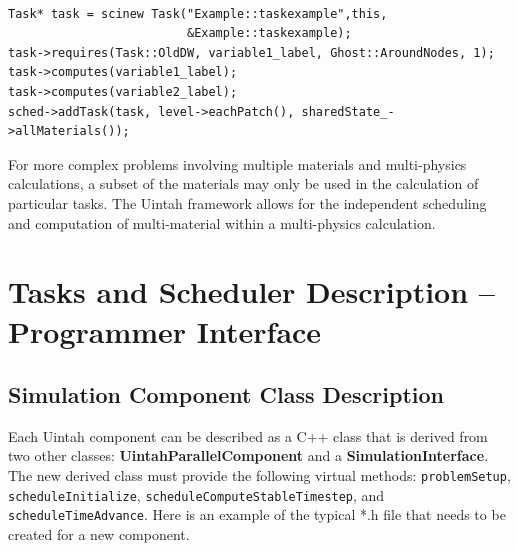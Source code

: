 \documentclass[12pt]{report}
\begin{document}
\begin{Verbatim}[fontsize=\footnotesize]

Task* task = scinew Task("Example::taskexample",this,
                         &Example::taskexample);
task->requires(Task::OldDW, variable1_label, Ghost::AroundNodes, 1);
task->computes(variable1_label);
task->computes(variable2_label);
sched->addTask(task, level->eachPatch(), sharedState_->allMaterials());

\end{Verbatim}

For more complex problems involving multiple materials and
multi-physics calculations, a subset of the materials may only be used
in the calculation of particular tasks.  The Uintah framework allows
for the independent scheduling and computation of multi-material
within a multi-physics calculation.

\section{Tasks and Scheduler Description -- Programmer Interface}

\subsection{Simulation Component Class Description}

Each Uintah component can be described as a C++ class that is derived
from two other classes: \textbf{UintahParallelComponent} and a
\textbf{SimulationInterface}. The new derived class must provide the
following virtual methods: \texttt{problemSetup},
\texttt{scheduleInitialize}, \texttt{scheduleComputeStableTimestep},
and \texttt{scheduleTimeAdvance}.  Here is an example of the typical
*.h file that needs to be created for a new component.
\end{document}
